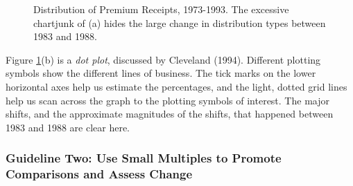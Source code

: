 \begin{figure}[htp]
  \begin{center}  \hfill
    \caption{\label{F21:DotPlotPremiumReceipts} \small Distribution of Premium Receipts, 1973-1993. The excessive
chartjunk of (a) hides the large change in distribution types
between 1983 and 1988.}
  \end{center}
\end{figure}


Figure \ref{F21:DotPlotPremiumReceipts}(b) is a \emph{dot plot},
discussed by Cleveland (1994). Different plotting symbols show the
different lines of business. The tick marks on the lower horizontal
axes help us estimate the percentages, and the light, dotted grid
lines help us scan across the graph to the plotting symbols of
interest. The major shifts, and the approximate magnitudes of the
shifts, that happened between 1983 and 1988 are clear here.

\linejed

\subsubsection*{Guideline Two: Use Small Multiples to Promote Comparisons and Assess Change}

